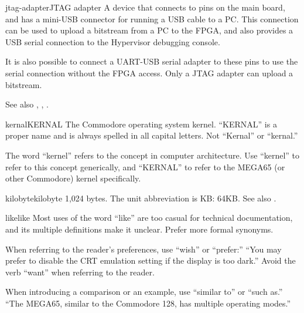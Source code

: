 \begin{sgentry}{jtag-adapter}{JTAG adapter}
    A device that connects to pins on the main board, and has a mini-USB connector for running a USB cable to a PC. This connection can be used to upload a bitstream from a PC to the FPGA, and also provides a USB serial connection to the Hypervisor debugging console.

    It is also possible to connect a UART-USB serial adapter to these pins to use the serial connection without the FPGA access. Only a JTAG adapter can upload a bitstream.

    See also , , .
\end{sgentry}

\begin{sgentry}{kernal}{KERNAL}
    The Commodore operating system kernel. ``KERNAL'' is a proper name and is always spelled in all capital letters. Not ``Kernal'' or ``kernal.''

    The word ``kernel'' refers to the concept in computer architecture. Use ``kernel'' to refer to this concept generically, and ``KERNAL'' to refer to the MEGA65 (or other Commodore) kernel specifically.
\end{sgentry}

\begin{sgentry}{kilobyte}{kilobyte}
    1,024 bytes. The unit abbreviation is KB: 64KB. See also .
\end{sgentry}

\begin{sgentry}{like}{like}
    Most uses of the word ``like'' are too casual for technical documentation, and its multiple definitions make it unclear. Prefer more formal synonyms.

    When referring to the reader's preferences, use ``wish'' or ``prefer:'' ``You may prefer to disable the CRT emulation setting if the display is too dark.'' Avoid the verb ``want'' when referring to the reader.

    When introducing a comparison or an example, use ``similar to'' or ``such as.'' ``The MEGA65, similar to the Commodore 128, has multiple operating modes.''
\end{sgentry}

